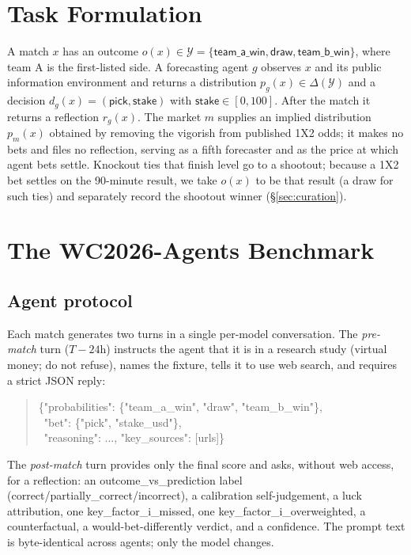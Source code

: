 \documentclass[sigconf,review]{acmart}
\begin{document}
\section{Task Formulation}
\label{sec:task}
A match $x$ has an outcome $o(x)\in\mathcal{Y}=\{\textsf{team\_a\_win},
\textsf{draw}, \textsf{team\_b\_win}\}$, where team A is the first-listed side.
A forecasting agent $g$ observes $x$ and its public information environment and
returns a distribution $p_g(x)\in\Delta(\mathcal{Y})$ and a decision
$d_g(x)=(\textsf{pick},\textsf{stake})$ with $\textsf{stake}\in[0,100]$. After
the match it returns a reflection $r_g(x)$. The market $m$ supplies an implied
distribution $p_m(x)$ obtained by removing the vigorish from published 1X2 odds;
it makes no bets and files no reflection, serving as a fifth forecaster and as
the price at which agent bets settle. Knockout ties that finish level go to a
shootout; because a 1X2 bet settles on the 90-minute result, we take $o(x)$ to
be that result (a \textsf{draw} for such ties) and separately record the
shootout winner (\S\ref{sec:curation}).

\section{The WC2026-Agents Benchmark}
\label{sec:bench}

\subsection{Agent protocol}
Each match generates two turns in a single per-model conversation. The
\emph{pre-match} turn ($T{-}24$h) instructs the agent that it is in a research
study (virtual money; do not refuse), names the fixture, tells it to use web
search, and requires a strict JSON reply:
\begin{quote}\small\ttfamily\raggedright
\{"probabilities": \{"team\_a\_win", "draw", "team\_b\_win"\},\\
\ "bet": \{"pick", "stake\_usd"\},\\
\ "reasoning": ..., "key\_sources": [urls]\}
\end{quote}
The \emph{post-match} turn provides only the final score and asks, without
web access, for a reflection: an \textsf{outcome\_vs\_prediction} label
(\textsf{correct}/\textsf{partially\_correct}/\textsf{incorrect}), a calibration
self-judgement, a luck attribution, one \textsf{key\_factor\_i\_missed}, one
\textsf{key\_factor\_i\_overweighted}, a counterfactual, a would-bet-differently
verdict, and a confidence. The prompt text is byte-identical across agents; only
the model changes.
\end{document}
